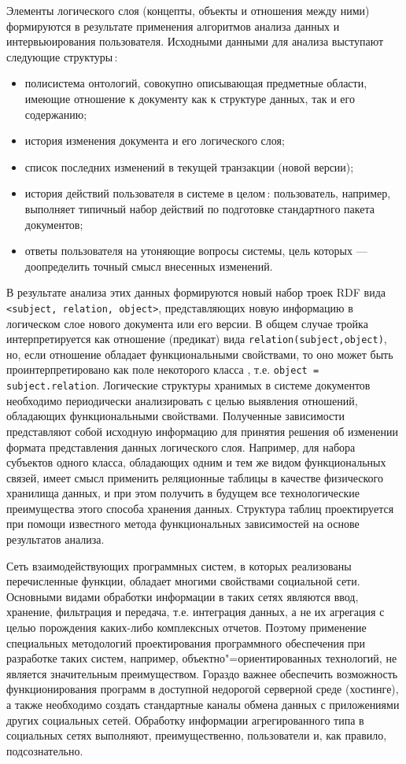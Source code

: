 \documentclass[utf8]{../IncArticle}
\begin{document}
Элементы логического слоя (концепты, объекты и отношения между ними)
формируются в результате применения алгоритмов анализа данных и
интервьюирования пользователя.  Исходными данными для анализа
выступают следующие структуры\,:
\begin{itemize}
\item полисистема онтологий, совокупно описывающая предметные области,
  имеющие отношение к документу как к структуре данных, так и его
  содержанию;
\item история изменения документа и его логического слоя;
\item список последних изменений в текущей транзакции (новой версии);
\item история действий пользователя в системе в целом\,: пользователь,
  например, выполняет типичный набор действий по подготовке
  стандартного пакета документов;
\item ответы пользователя на утоняющие вопросы системы, цель которых
  --- доопределить точный смысл внесенных изменений.
\end{itemize}

В результате анализа этих данных формируются новый набор троек RDF
вида \texttt{<subject, relation, object>}, представляющих новую
информацию в логическом слое нового документа или его версии.  В общем
случае тройка интерпретируется как отношение (предикат) вида
\texttt{relation(subject,object)}, но, если отношение обладает
функциональными свойствами, то оно может быть проинтерпретировано как
поле некоторого класса \cite{kazakovdiss}, т.е.  \texttt{object =
  subject.relation}.  Логические структуры хранимых в системе
документов необходимо периодически анализировать с целью выявления
отношений, обладающих функциональными свойствами.  Полученные
зависимости представляют собой исходную информацию для принятия
решения об изменении формата представления данных логического слоя.
Например, для набора субъектов одного класса, обладающих одним и тем
же видом функциональных связей, имеет смысл применить реляционные таблицы
в качестве физического хранилища данных, и при этом получить в будущем все
технологические преимущества этого способа хранения данных.  Структура
таблиц проектируется при помощи известного метода функциональных
зависимостей на основе результатов анализа.

Сеть взаимодействующих программных систем, в которых реализованы
перечисленные функции, обладает многими свойствами социальной сети.
Основными видами обработки информации в таких сетях являются ввод,
хранение, фильтрация и передача, т.е. интеграция данных, а не их
агрегация с целью порождения каких-либо комплексных отчетов.  Поэтому
применение специальных методологий проектирования программного
обеспечения при разработке таких систем, например,
объектно"=ориентированных технологий, не является значительным
преимуществом.  Гораздо важнее обеспечить возможность функционирования
программ в доступной недорогой серверной среде (хостинге), а также
необходимо создать стандартные каналы обмена данных с приложениями
других социальных сетей.  Обработку информации агрегированного типа в
социальных сетях выполняют, преимущественно, пользователи и, как
правило, подсознательно.
\end{document}
